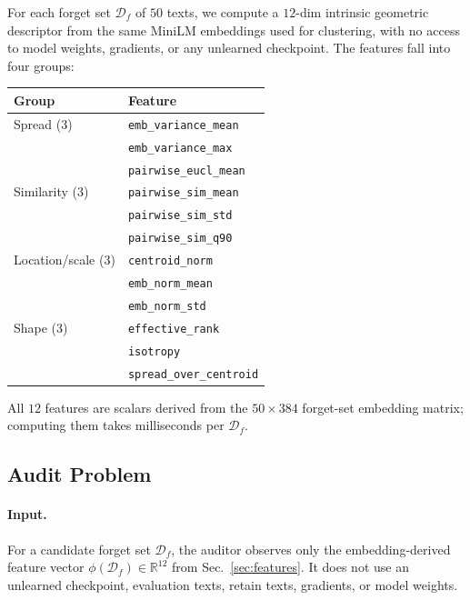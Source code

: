 \documentclass[11pt]{article}
\newcommand{\Df}{\mathcal{D}_f}
\begin{document}
For each forget set $\Df$ of $50$ texts, we compute a $12$-dim intrinsic
geometric descriptor from the same MiniLM embeddings used for clustering, with
no access to model weights, gradients, or any unlearned checkpoint. The features
fall into four groups:
\begin{center}
\footnotesize
\begin{tabular}{@{}ll@{}}
    \toprule
    Group & Feature \\
    \midrule
    Spread (3)
        & \texttt{emb\_variance\_mean} \\
        & \texttt{emb\_variance\_max} \\
        & \texttt{pairwise\_eucl\_mean} \\
    Similarity (3)
        & \texttt{pairwise\_sim\_mean} \\
        & \texttt{pairwise\_sim\_std} \\
        & \texttt{pairwise\_sim\_q90} \\
    Location/scale (3)
        & \texttt{centroid\_norm} \\
        & \texttt{emb\_norm\_mean} \\
        & \texttt{emb\_norm\_std} \\
    Shape (3)
        & \texttt{effective\_rank} \\
        & \texttt{isotropy} \\
        & \texttt{spread\_over\_centroid} \\
    \bottomrule
\end{tabular}
\end{center}
All $12$ features are scalars derived from the $50\times 384$ forget-set embedding matrix; computing them takes milliseconds per $\Df$.

\subsection{Audit Problem}
\label{sec:audit-problem}

\paragraph{Input.} For a candidate forget set $\Df$, the auditor observes only
the embedding-derived feature vector $\phi(\Df)\in\mathbb{R}^{12}$ from
Sec.~\ref{sec:features}. It does not use an unlearned checkpoint, evaluation
texts, retain texts, gradients, or model weights.
\end{document}
